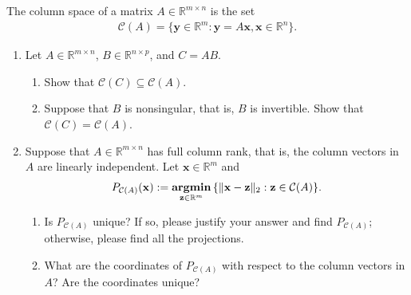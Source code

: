 \documentclass[11pt,letter,notitlepage]{article}
\DeclareMathOperator*{\argmin}{\bf argmin}
\begin{document}
\newpage

\begin{exercise}
    The column space of a matrix $A\in\mathbb{R}^{m\times n}$ is the set
    \begin{align}\label{def:column-space}
        \mathcal{C}(A)=\{\mathbf{y}\in\mathbb{R}^m: \mathbf{y}=A\mathbf{x}, \mathbf{x}\in\mathbb{R}^n\}.
    \end{align}

    \begin{enumerate}
        \item Let $A\in\mathbb{R}^{m\times n}$, $B\in\mathbb{R}^{n\times p}$, and $C=AB$.
              \begin{enumerate}
                  \item Show that $\mathcal{C}(C)\subseteq\mathcal{C}(A)$.

                  \item Suppose that $B$ is nonsingular, that is, $B$ is invertible. Show that $\mathcal{C}(C)=\mathcal{C}(A)$.
              \end{enumerate}

        \item\label{exercise:subspace-2} Suppose that $A\in\mathbb{R}^{m\times n}$ has full column rank, that is, the column vectors in $A$ are linearly independent. Let $\mathbf{x}\in\mathbb{R}^m$ and
              \begin{align}\label{prob:proj-subspace}
                  P_{\mathcal{C}(A)}(\mathbf{x}):=\argmin_{\mathbf{z}\in\mathbb{R}^m}\,\{\|\mathbf{x}-\mathbf{z}\|_2: \mathbf{z}\in\mathcal{C}(A)\}.
              \end{align}

              \begin{enumerate}

                  \item Is $P_{\mathcal{C}(A)}$ unique? If so, please justify your answer and find $P_{\mathcal{C}(A)}$; otherwise, please find all the projections.

                  \item What are the coordinates of $P_{\mathcal{C}(A)}$ with respect to the column vectors in $A$? Are the coordinates unique?
              \end{enumerate}



\end{enumerate}
\end{exercise}
\end{document}
